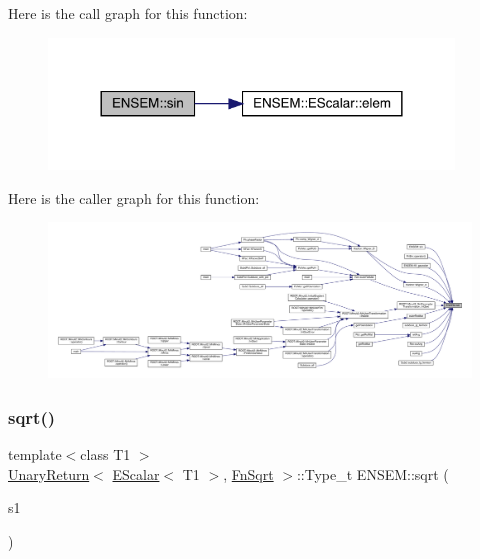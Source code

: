 Here is the call graph for this function\+:
\nopagebreak
\begin{figure}[H]
\begin{center}
\leavevmode
\includegraphics[width=305pt]{d4/dca/group__escalar_ga373122acba11edfbe0eff82093788afe_cgraph}
\end{center}
\end{figure}
Here is the caller graph for this function\+:
\nopagebreak
\begin{figure}[H]
\begin{center}
\leavevmode
\includegraphics[width=350pt]{d4/dca/group__escalar_ga373122acba11edfbe0eff82093788afe_icgraph}
\end{center}
\end{figure}
\mbox{\label{group__escalar_ga4e0889a609d84d3ddac113e68bfccfa4}} 
\subsubsection{\texorpdfstring{sqrt()}{sqrt()}}
{\footnotesize\ttfamily template$<$class T1 $>$ \\
\mbox{\hyperlink{structENSEM_1_1UnaryReturn}{Unary\+Return}}$<$ \mbox{\hyperlink{classENSEM_1_1EScalar}{E\+Scalar}}$<$ T1 $>$, \mbox{\hyperlink{structENSEM_1_1FnSqrt}{Fn\+Sqrt}} $>$\+::Type\+\_\+t E\+N\+S\+E\+M\+::sqrt (\begin{DoxyParamCaption}\item[{const \mbox{\hyperlink{classENSEM_1_1EScalar}{E\+Scalar}}$<$ T1 $>$ \&}]{s1 }\end{DoxyParamCaption})\hspace{0.3cm}{\ttfamily [inline]}}

